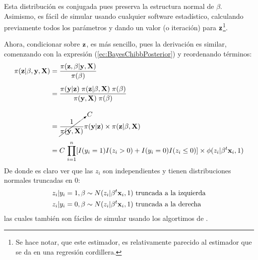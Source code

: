 \documentclass[../Main/Main.tex]{subfiles}
\begin{document}
Esta distribución es conjugada pues preserva la estructura normal de $\beta$. Asimismo, es fácil de simular usando cualquier software estadístico, calculando previamente todos los parámetros y dando un valor (o iteración) para $\mathbf{z}$\footnote{Se hace notar, que este estimador, es relativamente parecido al estimador que se da en una regresión cordillera.}.

Ahora, condicionar sobre $\mathbf{z}$, es más sencillo, pues la derivación es similar, comenzando con la expresión (\ref{ec:BayesChibbPosterior}) y reordenando términos:
\begin{align}
	\pi(\mathbf{z}|\beta,\mathbf{y},\mathbf{X})
	& = \dfrac{\pi(\mathbf{z}, \beta| \mathbf{y}, \mathbf{X})}{\pi(\beta)} \nonumber \\[5pt]
	& = \dfrac{\pi(\mathbf{y} | \mathbf{z})\;\pi(\mathbf{z}|\beta,\mathbf{X}) \; \pi(\beta)}			{\pi(\mathbf{y}, \mathbf{X}) \; \pi(\beta)} \nonumber \\[10pt]
	& = \cancelto{C}{\dfrac{1}{\pi(\mathbf{y}, \mathbf{X})}}\pi(\mathbf{y} | \mathbf{z}) \times \pi(\mathbf{z}|\beta,\mathbf{X}) \nonumber \\[5pt]
	& = C \, \prod_{i = 1}^n[I(y_i = 1)I(z_i > 0) + I(y_i = 0)I(z_i \leq 0)] \times \phi(z_i|\beta^t\mathbf{x}_i,1) \label{ec:BayesChibbZCond}
\end{align}
De donde es claro ver que las $z_i$ son independientes y tienen distribuciones normales truncadas en $0$:
\begin{align}
	z_i|y_i = 1,\beta &\sim N(z_i|\beta^t\mathbf{x}_i,1) \text{ truncada a la izquierda} \label{ec:SimZ}\\
	z_i|y_i = 0,\beta &\sim N(z_i|\beta^t\mathbf{x}_i,1) \text{ truncada a la derecha} \nonumber
\end{align}
las cuales también son fáciles de simular usando los algortimos de \autocite{devroye1986non}.
\end{document}
